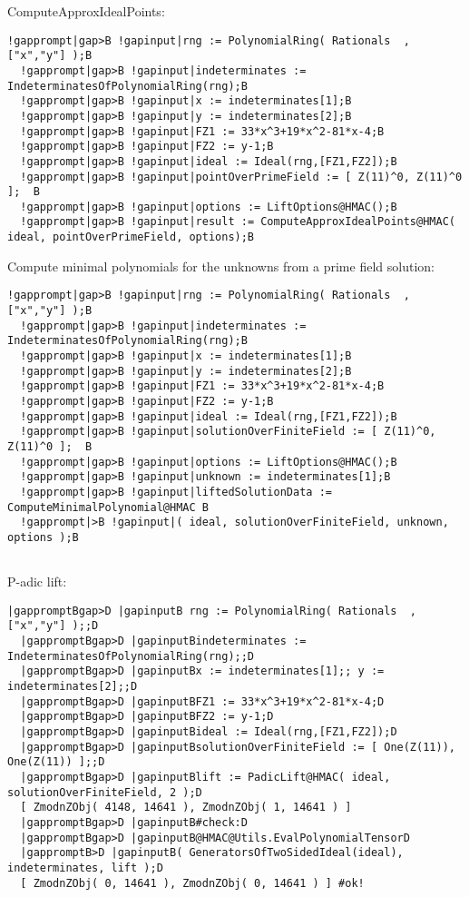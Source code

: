 \documentclass[a4paper,11pt]{report}
\begin{document}
{\begin{Verbatim}[commandchars=!|B,fontsize=\small,frame=single,label=Example]
\end{Verbatim}
 ComputeApproxIdealPoints: 
\begin{Verbatim}[commandchars=!|B,fontsize=\small,frame=single,label=Example]
  !gapprompt|gap>B !gapinput|rng := PolynomialRing( Rationals  ,["x","y"] );B
  !gapprompt|gap>B !gapinput|indeterminates := IndeterminatesOfPolynomialRing(rng);B
  !gapprompt|gap>B !gapinput|x := indeterminates[1];B
  !gapprompt|gap>B !gapinput|y := indeterminates[2];B
  !gapprompt|gap>B !gapinput|FZ1 := 33*x^3+19*x^2-81*x-4;B
  !gapprompt|gap>B !gapinput|FZ2 := y-1;B
  !gapprompt|gap>B !gapinput|ideal := Ideal(rng,[FZ1,FZ2]);B
  !gapprompt|gap>B !gapinput|pointOverPrimeField := [ Z(11)^0, Z(11)^0 ];  B
  !gapprompt|gap>B !gapinput|options := LiftOptions@HMAC();B
  !gapprompt|gap>B !gapinput|result := ComputeApproxIdealPoints@HMAC( ideal, pointOverPrimeField, options);B
\end{Verbatim}
 Compute minimal polynomials for the unknowns from a prime field solution: 
\begin{Verbatim}[commandchars=!|B,fontsize=\small,frame=single,label=Example]
  !gapprompt|gap>B !gapinput|rng := PolynomialRing( Rationals  ,["x","y"] );B
  !gapprompt|gap>B !gapinput|indeterminates := IndeterminatesOfPolynomialRing(rng);B
  !gapprompt|gap>B !gapinput|x := indeterminates[1];B
  !gapprompt|gap>B !gapinput|y := indeterminates[2];B
  !gapprompt|gap>B !gapinput|FZ1 := 33*x^3+19*x^2-81*x-4;B
  !gapprompt|gap>B !gapinput|FZ2 := y-1;B
  !gapprompt|gap>B !gapinput|ideal := Ideal(rng,[FZ1,FZ2]);B
  !gapprompt|gap>B !gapinput|solutionOverFiniteField := [ Z(11)^0, Z(11)^0 ];  B
  !gapprompt|gap>B !gapinput|options := LiftOptions@HMAC();B
  !gapprompt|gap>B !gapinput|unknown := indeterminates[1];B
  !gapprompt|gap>B !gapinput|liftedSolutionData := ComputeMinimalPolynomial@HMAC B
  !gapprompt|>B !gapinput|( ideal, solutionOverFiniteField, unknown, options );B
   
\end{Verbatim}
 P-adic lift: 
\begin{Verbatim}[commandchars=|BD,fontsize=\small,frame=single,label=Example]
  |gappromptBgap>D |gapinputB rng := PolynomialRing( Rationals  ,["x","y"] );;D
  |gappromptBgap>D |gapinputBindeterminates := IndeterminatesOfPolynomialRing(rng);;D
  |gappromptBgap>D |gapinputBx := indeterminates[1];; y := indeterminates[2];;D
  |gappromptBgap>D |gapinputBFZ1 := 33*x^3+19*x^2-81*x-4;D
  |gappromptBgap>D |gapinputBFZ2 := y-1;D
  |gappromptBgap>D |gapinputBideal := Ideal(rng,[FZ1,FZ2]);D
  |gappromptBgap>D |gapinputBsolutionOverFiniteField := [ One(Z(11)), One(Z(11)) ];;D
  |gappromptBgap>D |gapinputBlift := PadicLift@HMAC( ideal, solutionOverFiniteField, 2 );D
  [ ZmodnZObj( 4148, 14641 ), ZmodnZObj( 1, 14641 ) ]
  |gappromptBgap>D |gapinputB#check:D
  |gappromptBgap>D |gapinputB@HMAC@Utils.EvalPolynomialTensorD
  |gappromptB>D |gapinputB( GeneratorsOfTwoSidedIdeal(ideal), indeterminates, lift );D
  [ ZmodnZObj( 0, 14641 ), ZmodnZObj( 0, 14641 ) ] #ok!
\end{Verbatim}
 }
\end{document}
